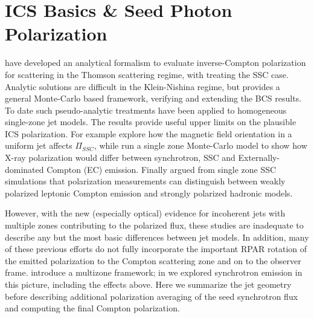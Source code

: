 \section{ICS Basics \& Seed Photon Polarization}

\citet{bonometto_polarization_1970} have developed an analytical formalism to evaluate inverse-Compton polarization for scattering in the Thomson scattering regime, with \citet[][hereafter BCS]{bonometto_polarization_1973} treating the SSC case. Analytic solutions are difficult in the Klein-Nishina regime, but \citet{krawczynski_polarization_2012} provides a general Monte-Carlo based framework, verifying and extending the BCS results. To date such pseudo-analytic treatments have been applied to homogeneous single-zone jet models. The results provide useful upper limits on the plausible ICS polarization. For example \citet{poutanen_relativistic_1994} explore how the magnetic field orientation in a uniform jet affects $\Pi_{SSC}$, while \citet{mcnamara_x-ray_2009} run a single zone Monte-Carlo model to show how X-ray polarization would differ between synchrotron, SSC and Externally-dominated Compton (EC) emission. Finally \citet{zhang_x-ray_2013} argued from single zone SSC simulations that polarization measurements can distinguish between weakly polarized leptonic Compton emission and strongly polarized hadronic models. 

However, with the new (especially optical) evidence for incoherent jets with multiple zones contributing to the polarized flux, these studies are inadequate to describe any but the most basic differences between jet models. In addition, many of these previous efforts do not fully incorporate the important RPAR rotation of the emitted polarization to the Compton scattering zone and on to the observer frame. \citet{marscher_turbulent_2014} introduce a multizone framework; in \citet{peirson_polarization_2018} we explored synchrotron emission in this picture, including the effects above. Here we summarize the jet geometry before describing additional polarization averaging of the seed synchrotron flux and computing the final Compton polarization.

